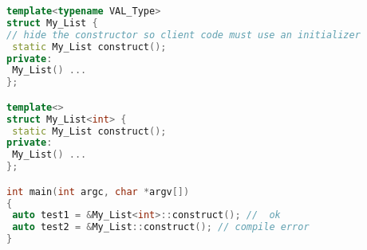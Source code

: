 \begin{lstlisting}[caption={Addressable vs. Multi-Addressable Initializers}, 
  language = C++, numbers = none, escapechar = !,label={lst:multi},
    basicstyle = \ttfamily\bfseries\footnotesize, linewidth = \linewidth]
template<typename VAL_Type>
struct My_List {
// hide the constructor so client code must use an initializer
 static My_List construct();
private:
 My_List() ... 
};

template<>
struct My_List<int> {
 static My_List construct();
private:
 My_List() ... 
};

int main(int argc, char *argv[])
{
 auto test1 = &My_List<int>::construct(); //  ok
 auto test2 = &My_List::construct(); // compile error
}
\end{lstlisting}

\vspace{-1em}
